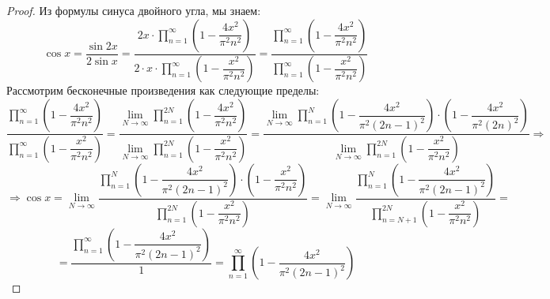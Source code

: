 \documentclass[12pt]{article}
\theoremstyle{definition}
\begin{document}
\begin{proof}
	Из формулы синуса двойного угла, мы знаем:
	$$
		\cos{x} = \dfrac{\sin{2x}}{2\sin{x}} 
		= \dfrac{2x{\cdot}\prod\limits_{n = 1}^{\infty}\left(1 - \dfrac{4x^2}{\pi^2 n^2}\right)}{2{\cdot}x{\cdot}\prod\limits_{n = 1}^{\infty}\left(1 - \dfrac{x^2}{\pi^2 n^2}\right)}  
		= \dfrac{\prod\limits_{n = 1}^{\infty}\left(1 - \dfrac{4x^2}{\pi^2 n^2}\right)}{\prod\limits_{n = 1}^{\infty}\left(1 - \dfrac{x^2}{\pi^2 n^2}\right)}
	$$
	Рассмотрим бесконечные произведения как следующие пределы:
	$$
		\dfrac{\prod\limits_{n = 1}^{\infty}\left(1 - \dfrac{4x^2}{\pi^2 n^2}\right)}{\prod\limits_{n = 1}^{\infty}\left(1 - \dfrac{x^2}{\pi^2 n^2}\right)} 
		= \dfrac{\lim\limits_{N \to \infty}\prod\limits_{n = 1}^{2N}\left(1 - \dfrac{4x^2}{\pi^2 n^2}\right)}{\lim\limits_{N \to \infty}\prod\limits_{n = 1}^{2N}\left(1 - \dfrac{x^2}{\pi^2 n^2}\right)} 
		= \dfrac{\lim\limits_{N \to \infty}\prod\limits_{n = 1}^{N}\left(1 - \dfrac{4x^2}{\pi^2 (2n-1)^2}\right){\cdot}\left(1 - \dfrac{4x^2}{\pi^2 (2n)^2}\right)}{\lim\limits_{N \to \infty}\prod\limits_{n = 1}^{2N}\left(1 - \dfrac{x^2}{\pi^2 n^2}\right)} \Rightarrow	
	$$
	$$
		\Rightarrow \cos{x} = \lim\limits_{N \to \infty}\dfrac{\prod\limits_{n = 1}^{N}\left(1 - \dfrac{4x^2}{\pi^2 (2n-1)^2}\right){\cdot}\left(1 - \dfrac{x^2}{\pi^2 n^2}\right)}{\prod\limits_{n = 1}^{2N}\left(1 - \dfrac{x^2}{\pi^2 n^2}\right)}
		= \lim\limits_{N \to \infty}\dfrac{\prod\limits_{n = 1}^{N}\left(1 - \dfrac{4x^2}{\pi^2 (2n-1)^2}\right)}{\prod\limits_{n = N + 1}^{2N}\left(1 - \dfrac{x^2}{\pi^2 n^2}\right)} = 
	$$
	$$
		=	\dfrac{\prod\limits_{n = 1}^{\infty}\left(1 - \dfrac{4x^2}{\pi^2 (2n-1)^2}\right)}{1} = \prod\limits_{n = 1}^{\infty}\left(1 - \dfrac{4x^2}{\pi^2 (2n-1)^2}\right)
	$$
\end{proof}
\end{document}
